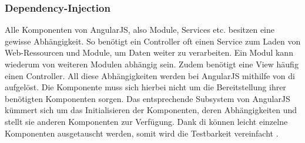 \subsubsection{Dependency-Injection}

Alle Komponenten von AngularJS, also Module, Services etc. besitzen eine gewisse Abhängigkeit. So benötigt ein Controller oft einen Service zum Laden von Web-Ressourcen und Module, um Daten weiter zu verarbeiten. Ein Modul kann wiederum von weiteren Modulen abhängig sein. Zudem benötigt eine View häufig einen Controller. All diese Abhängigkeiten werden bei AngularJS mithilfe von \ac{di} aufgelöst. Die Komponente muss sich hierbei nicht um die Bereitstellung ihrer benötigten Komponenten sorgen. Das entsprechende Subsystem von AngularJS kümmert sich um das Initialisieren der Komponenten, deren Abhängigkeiten und stellt sie anderen Komponenten zur Verfügung. Dank \ac{di} können leicht einzelne Komponenten ausgetauscht werden, somit wird die Testbarkeit vereinfacht \cite{angularDoc}.
